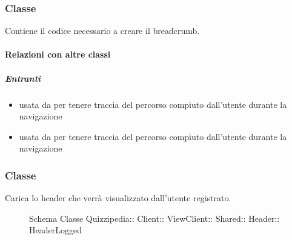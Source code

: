 \subsubsection{Classe }
Contiene il codice necessario a creare il breadcrumb.
\paragraph{Relazioni con altre classi}
\subparagraph{Entranti}
\begin{itemize}
\item usata da  per tenere traccia del percorso compiuto dall'utente durante la navigazione
\item usata da  per tenere traccia del percorso compiuto dall'utente durante la navigazione
\end{itemize}
\subsubsection{Classe }
Carica lo header che verrà visualizzato dall'utente registrato.
\begin{figure}[H]
\centering
\noindent{}
\caption[Schema Classe HeaderLogged]{Schema Classe Quizzipedia:: Client:: ViewClient:: Shared:: Header:: HeaderLogged}
\end{figure}
